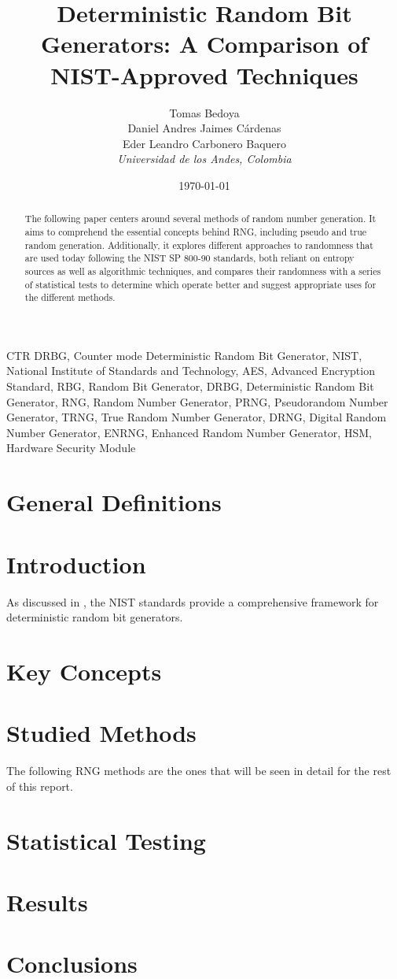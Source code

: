 \documentclass[conference]{IEEEtran}
\title{Deterministic Random Bit Generators: A Comparison of NIST-Approved Techniques}
\author{
    Tomas Bedoya \\
    Daniel Andres Jaimes Cárdenas \\
    Eder Leandro Carbonero Baquero \\
    \textit{Universidad de los Andes, Colombia}
}
\date{\today}
\begin{document}
\maketitle

\begin{abstract}
The following paper centers around several methods of random number generation. It aims to comprehend the essential concepts behind RNG, including pseudo and true random generation. Additionally, it explores different approaches to randomness that are used today following the NIST SP 800-90 standards, both reliant on entropy sources as well as algorithmic techniques, and compares their randomness with a series of statistical tests to determine which operate better and suggest appropriate uses for the different methods.
\end{abstract}

\begin{IEEEkeywords}
CTR DRBG, Counter mode Deterministic Random Bit Generator, NIST, National Institute of Standards and Technology, AES, Advanced Encryption Standard, RBG, Random Bit Generator, DRBG, Deterministic Random Bit Generator, RNG, Random Number Generator, PRNG, Pseudorandom Number Generator, TRNG, True Random Number Generator, DRNG, Digital Random Number Generator, ENRNG, Enhanced Random Number Generator, HSM, Hardware Security Module
\end{IEEEkeywords}

\section{General Definitions}


\section{Introduction}


As discussed in \cite{nist800-90a}, the NIST standards provide a comprehensive framework for deterministic random bit generators.

\section{Key Concepts}


\section{Studied Methods}
The following RNG methods are the ones that will be seen in detail for the rest of this report.


\section{Statistical Testing}


\section{Results}


\section{Conclusions}



\end{document}
